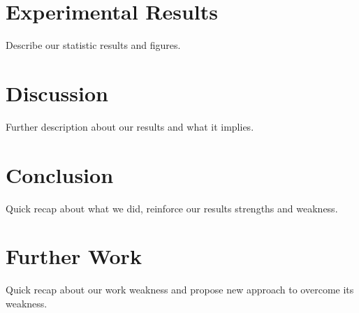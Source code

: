 \documentclass[conference]{IEEEtran}
\newcommand{\reviewUrgent}[1]{{\color{red} #1}} %
\begin{document}
\section{Experimental Results}
\reviewUrgent{Describe our statistic results and figures.}


\section{Discussion}
\reviewUrgent{Further description about our results and what it implies.}


\section{Conclusion}
\reviewUrgent{Quick recap about what we did, reinforce our results strengths and weakness.}

\section{Further Work}
\reviewUrgent{Quick recap about our work weakness and propose new approach to overcome its weakness.}





\end{document}
